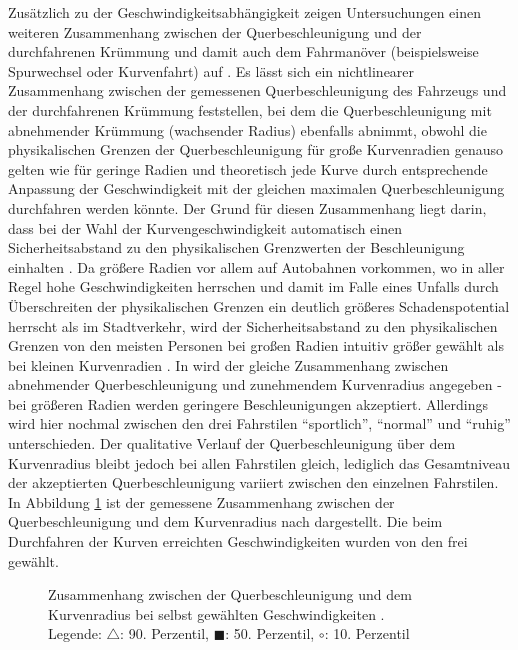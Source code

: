 Zusätzlich zu der Geschwindigkeitsabhängigkeit zeigen Untersuchungen einen weiteren Zusammenhang zwischen der Querbeschleunigung und der durchfahrenen Krümmung und damit auch dem Fahrmanöver (beispielsweise Spurwechsel oder Kurvenfahrt) auf \cite{Hugemann.2003,Xu.2015}. Es lässt sich ein nichtlinearer Zusammenhang zwischen der gemessenen Querbeschleunigung des Fahrzeugs und der durchfahrenen Krümmung feststellen, bei dem die Querbeschleunigung mit abnehmender Krümmung (wachsender Radius) ebenfalls abnimmt, obwohl die physikalischen Grenzen der Querbeschleunigung für große Kurvenradien genauso gelten wie für geringe Radien und theoretisch jede Kurve durch entsprechende Anpassung der Geschwindigkeit mit der gleichen maximalen Querbeschleunigung durchfahren werden könnte. Der Grund für diesen Zusammenhang liegt darin, dass  bei der Wahl der Kurvengeschwindigkeit automatisch einen Sicherheitsabstand zu den physikalischen Grenzwerten der Beschleunigung einhalten \cite{Hugemann.2003}. Da größere Radien vor allem auf Autobahnen vorkommen, wo in aller Regel hohe Geschwindigkeiten herrschen und damit im Falle eines Unfalls durch Überschreiten der physikalischen Grenzen ein deutlich größeres Schadenspotential herrscht als im Stadtverkehr, wird der Sicherheitsabstand zu den physikalischen Grenzen von den meisten Personen bei großen Radien intuitiv größer gewählt als bei kleinen Kurvenradien \cite{Xu.2015}. 
In \cite{Schulz.2008} wird der gleiche Zusammenhang zwischen abnehmender Querbeschleunigung und zunehmendem Kurvenradius angegeben - bei größeren Radien werden geringere Beschleunigungen akzeptiert. Allerdings wird hier nochmal zwischen den drei Fahrstilen ``sportlich'', ``normal'' und ``ruhig'' unterschieden. Der qualitative Verlauf der Querbeschleunigung über dem Kurvenradius bleibt jedoch bei allen Fahrstilen gleich, lediglich das Gesamtniveau der akzeptierten Querbeschleunigung variiert zwischen den einzelnen Fahrstilen. In Abbildung \ref{fig:ay_R_hugemann} ist der gemessene Zusammenhang zwischen der Querbeschleunigung und dem Kurvenradius nach \cite{Hugemann.2003} dargestellt. Die beim Durchfahren der Kurven erreichten Geschwindigkeiten wurden von den  frei gewählt. 
\begin{figure}[h]
	\centering
	\fontsize{28pt}{16pt}\selectfont
	\caption{Zusammenhang zwischen der Querbeschleunigung und dem Kurvenradius bei selbst gewählten Geschwindigkeiten \cite{Hugemann.2003}. \\
		Legende: $\triangle$: 90. Perzentil, $\blacksquare$: 50. Perzentil, $\circ$: 10. Perzentil}
	\label{fig:ay_R_hugemann}
\end{figure}

